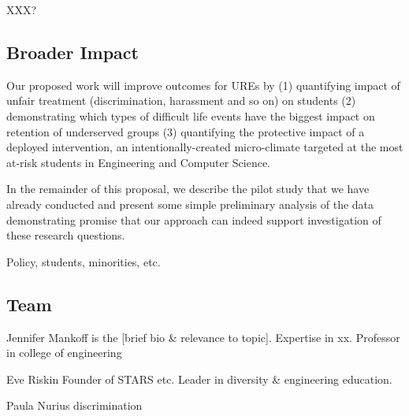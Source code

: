  
   \item \label{itm:xxx} XXX?

\subsection{Broader Impact}
\noindent
Our proposed work will improve outcomes for UREs by (1) quantifying impact of unfair treatment (discrimination, harassment and so on)  on students (2) demonstrating which types of difficult life events have the biggest impact on retention of underserved groups (3) quantifying the protective impact of a deployed intervention, an intentionally-created micro-climate targeted at the most at-risk students in Engineering and Computer Science. 
 
 
 In the remainder of this proposal, we describe the pilot study that we have already conducted and present some simple preliminary analysis of the data demonstrating promise that our approach can indeed support investigation of these research questions.

Policy, students, minorities, etc.
 
\subsection{Team}
 
Jennifer Mankoff is the [brief bio \& relevance to topic]. Expertise in xx. Professor in college of engineering 
 
Eve Riskin Founder of STARS etc. Leader in diversity & engineering education.
 
Paula Nurius discrimination
